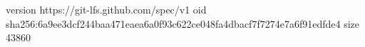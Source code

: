 version https://git-lfs.github.com/spec/v1
oid sha256:6a9ee3dcf244baa471eaea6a0f93c622ce048fa4dbacf7f7274e7a6f91edfde4
size 43860
